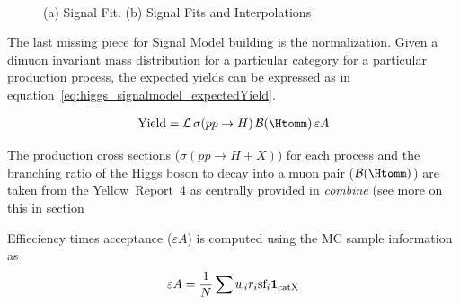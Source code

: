 \begin{figure}[hbp]
    \centering
    ~
    \caption{(a) Signal Fit. (b) Signal Fits and Interpolations}
    \label{fig:higgs_signalmodel_signalExamples}
 \end{figure}

%
%
The last missing piece for Signal Model building is the normalization.
Given a dimuon invariant mass distribution for a particular category for a particular production process,
the expected yields can be expressed as in equation~\ref{eq:higgs_signalmodel_expectedYield}.

\begin{align}
        \label{eq:higgs_signalmodel_expectedYield}
        \text{Yield} = \mathcal{L}\,\sigma(pp\rightarrow H)\, \mathcal{B}(\Htomm) \, \varepsilon A
\end{align}

The production cross sections ($\sigma(pp\rightarrow H+X)$) for each process and the branching ratio of the Higgs boson to decay into a muon pair ($\mathcal{B}(\Htomm)$) are taken from the Yellow~Report~4 \cite{YR4} as centrally provided in {\it combine} (see more on this in section%

Effieciency times acceptance ($\varepsilon A$) is computed using the MC sample information as
\begin{align}
\varepsilon A = \frac{1}{N}\sum w_i r_{i} \text{sf}_i \mathbf{1}_\textup{catX}
\end{align}

